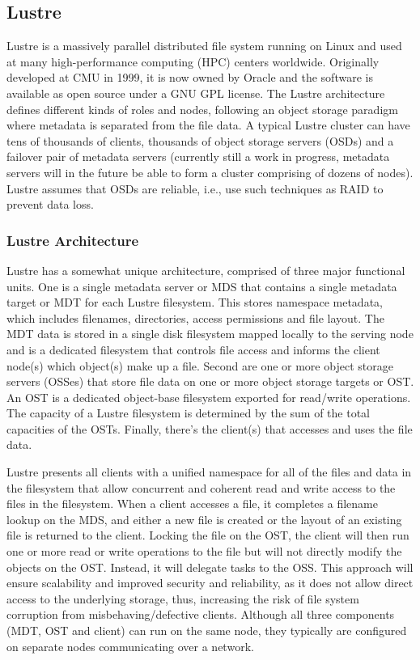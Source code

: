 \documentclass[11pt]{article}
\begin{document}
\subsection{Lustre}
Lustre is a massively parallel distributed file system running on Linux 
and used at many high-performance computing (HPC) centers worldwide. 
Originally developed at CMU in 1999, it is now owned by Oracle and the 
software is available as open source under a GNU GPL license. The Lustre 
architecture defines different kinds of roles and nodes, following an object 
storage paradigm where metadata is separated from the file data. A typical 
Lustre cluster can have tens of thousands of clients, thousands of object 
storage servers (OSDs) and a failover pair of metadata servers (currently 
still a work in progress, metadata servers will in the future be able to 
form a cluster comprising of dozens of nodes). Lustre assumes that OSDs 
are reliable, i.e., use such techniques as RAID to prevent data loss.

\subsubsection{Lustre Architecture}
Lustre has a somewhat unique architecture, comprised of three major 
functional units. One is a single metadata server or MDS that contains 
a single metadata target or MDT for each Lustre filesystem. This stores 
namespace metadata, which includes filenames, directories, access 
permissions and file layout. The MDT data is stored in a single disk 
filesystem mapped locally to the serving node and is a dedicated 
filesystem that controls file access and informs the client node(s) 
which object(s) make up a file. Second are one or more object storage 
servers (OSSes) that store file data on one or more object storage 
targets or OST. An OST is a dedicated object-base filesystem exported 
for read/write operations. The capacity of a Lustre filesystem is 
determined by the sum of the total capacities of the OSTs. Finally, 
there's the client(s) that accesses and uses the file data. 

Lustre presents all clients with a unified namespace for all of the 
files and data in the filesystem that allow concurrent and coherent 
read and write access to the files in the filesystem. When a client 
accesses a file, it completes a filename lookup on the MDS, and 
either a new file is created or the layout of an existing file is 
returned to the client. Locking the file on the OST, the client will 
then run one or more read or write operations to the file but will 
not directly modify the objects on the OST. Instead, it will delegate 
tasks to the OSS. This approach will ensure scalability and improved 
security and reliability, as it does not allow direct access to the 
underlying storage, thus, increasing the risk of file system corruption 
from misbehaving/defective clients. Although all three components 
(MDT, OST and client) can run on the same node, they typically are 
configured on separate nodes communicating over a network.
\end{document}
